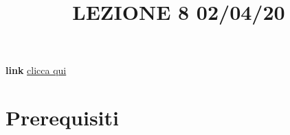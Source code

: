 \title{LEZIONE 8 02/04/20}\newline
\textbf{link} \href{https://web.microsoftstream.com/video/75f95083-fbf8-4126-8c4d-c65d89f7c6b3}{clicca qui}
\section*{Prerequisiti}

\section{}